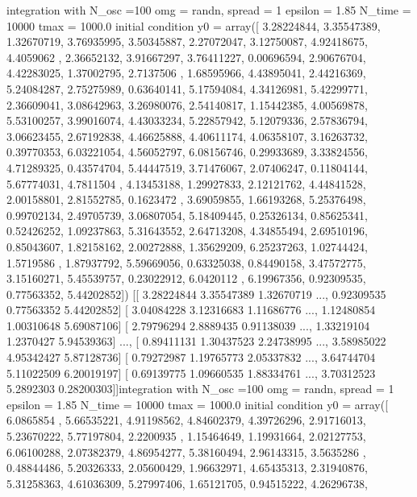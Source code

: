integration with
 N\_osc =100
omg = randn, spread = 1
epsilon = 1.85
N\_time = 10000
tmax = 1000.0
initial condition y0 = array([ 3.28224844,  3.35547389,  1.32670719,  3.76935995,  3.50345887,
        2.27072047,  3.12750087,  4.92418675,  4.4059062 ,  2.36652132,
        3.91667297,  3.76411227,  0.00696594,  2.90676704,  4.42283025,
        1.37002795,  2.7137506 ,  1.68595966,  4.43895041,  2.44216369,
        5.24084287,  2.75275989,  0.63640141,  5.17594084,  4.34126981,
        5.42299771,  2.36609041,  3.08642963,  3.26980076,  2.54140817,
        1.15442385,  4.00569878,  5.53100257,  3.99016074,  4.43033234,
        5.22857942,  5.12079336,  2.57836794,  3.06623455,  2.67192838,
        4.46625888,  4.40611174,  4.06358107,  3.16263732,  0.39770353,
        6.03221054,  4.56052797,  6.08156746,  0.29933689,  3.33824556,
        4.71289325,  0.43574704,  5.44447519,  3.71476067,  2.07406247,
        0.11804144,  5.67774031,  4.7811504 ,  4.13453188,  1.29927833,
        2.12121762,  4.44841528,  2.00158801,  2.81552785,  0.1623472 ,
        3.69059855,  1.66193268,  5.25376498,  0.99702134,  2.49705739,
        3.06807054,  5.18409445,  0.25326134,  0.85625341,  0.52426252,
        1.09237863,  5.31643552,  2.64713208,  4.34855494,  2.69510196,
        0.85043607,  1.82158162,  2.00272888,  1.35629209,  6.25237263,
        1.02744424,  1.5719586 ,  1.87937792,  5.59669056,  0.63325038,
        0.84490158,  3.47572775,  3.15160271,  5.45539757,  0.23022912,
        6.0420112 ,  6.19967356,  0.92309535,  0.77563352,  5.44202852])
[[ 3.28224844  3.35547389  1.32670719 ...,  0.92309535  0.77563352
   5.44202852]
 [ 3.04084228  3.12316683  1.11686776 ...,  1.12480854  1.00310648
   5.69087106]
 [ 2.79796294  2.8889435   0.91138039 ...,  1.33219104  1.2370427
   5.94539363]
 ..., 
 [ 0.89411131  1.30437523  2.24738995 ...,  3.58985022  4.95342427
   5.87128736]
 [ 0.79272987  1.19765773  2.05337832 ...,  3.64744704  5.11022509
   6.20019197]
 [ 0.69139775  1.09660535  1.88334761 ...,  3.70312523  5.2892303
   0.28200303]]integration with
 N\_osc =100
omg = randn, spread = 1
epsilon = 1.85
N\_time = 10000
tmax = 1000.0
initial condition y0 = array([ 6.0865854 ,  5.66535221,  4.91198562,  4.84602379,  4.39726296,
        2.91716013,  5.23670222,  5.77197804,  2.2200935 ,  1.15464649,
        1.19931664,  2.02127753,  6.06100288,  2.07382379,  4.86954277,
        5.38160494,  2.96143315,  3.5635286 ,  0.48844486,  5.20326333,
        2.05600429,  1.96632971,  4.65435313,  2.31940876,  5.31258363,
        4.61036309,  5.27997406,  1.65121705,  0.94515222,  4.26296738,

